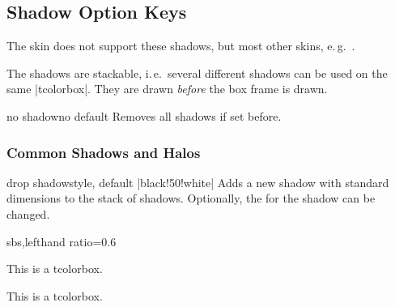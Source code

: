 \begin{dispExample}
\begin{tcolorbox}[enhanced,colback=yellow!10!white,boxrule=0pt,frame hidden,
  borderline north={1mm}{-2mm}{red},
  borderline south={1mm}{-2mm}{blue},
  borderline west={1mm}{-2mm}{green},
  borderline east={1mm}{-2mm}{yellow}]
\lipsum[1]
\end{tcolorbox}
\end{dispExample}

\clearpage
\subsection{Shadow Option Keys}\label{subsec:shadows}
The skin  does not support these shadows,
but most other skins, e.\,g.\ .

The shadows are stackable, i.\,e.\ several different shadows can be
used on the same |tcolorbox|. They are drawn \emph{before} the box frame is drawn.

\begin{docTcbKey}{no shadow}{}{no default}
  Removes all shadows if set before.
\end{docTcbKey}

\subsubsection{Common Shadows and Halos}

\begin{docTcbKey}{drop shadow}{}{style, default |black!50!white|}
  Adds a new shadow with standard dimensions to the stack of shadows.
  Optionally, the  for the shadow can be changed.
\begin{dispExample*}{sbs,lefthand ratio=0.6}

\begin{tcolorbox}
This is a tcolorbox.
\end{tcolorbox}\par\bigskip
\begin{tcolorbox}[title=Another shadow,
  drop shadow=blue]
This is a tcolorbox.
\end{tcolorbox}
\end{dispExample*}
\end{docTcbKey}


